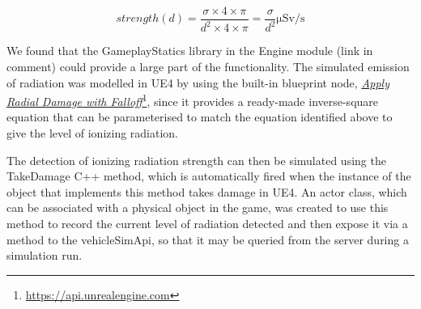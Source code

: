 \[strength(d) = \frac{\sigma \times 4 \times \pi}{d^2 \times 4 \times \pi} = \frac{\sigma}{d^2} \si{\micro\sievert\per\second}\]

We found that the GameplayStatics library in the Engine module (link in comment) %
could provide a large part of the functionality. The simulated emission of radiation was modelled in UE4 by using the built-in blueprint node,
\href{https://api.unrealengine.com/INT/API/Runtime/Engine/Kismet/UGameplayStatics/ApplyRadialDamageWithFalloff/index.html}{\emph{Apply Radial Damage with Falloff}}\footnote{\href{https://api.unrealengine.com/INT/API/Runtime/Engine/Kismet/UGameplayStatics/ApplyRadialDamageWithFalloff/index.html}{https://api.unrealengine.com}}, since it provides a ready-made inverse-square equation that can be parameterised to match the equation identified above to give the level of ionizing radiation.


The detection of ionizing radiation strength can then be simulated using the TakeDamage C++ method, which is automatically fired when the instance of the object that implements this method takes damage in UE4. An actor class, which can be associated with a physical object in the game, was created to use this method to record the current level of radiation detected and then expose it via a method to the vehicleSimApi, so that it may be queried from the server during a simulation run.

